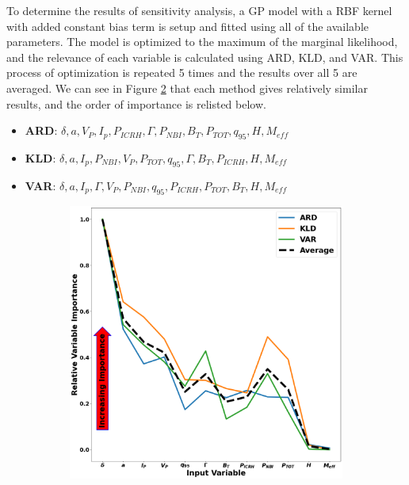 \documentclass[a4paper, twoside, final, 12pt]{article}
\begin{document}
{To determine the results of sensitivity analysis, a GP model with a RBF kernel with added constant bias term is setup and fitted using all of the available parameters. The model is optimized to the maximum of the marginal likelihood, and the relevance of each variable is calculated using ARD, KLD, and VAR. This process of optimization is repeated 5 times and the results over all 5 are averaged. We can see in Figure \ref{subfig:ARD_KL_VAR} that each method gives relatively similar results, and the order of importance is relisted below.  
\begin{itemize}
	\item \textbf{ARD}: $\delta, a, V_P,  I_p, P_{ICRH}, \Gamma, P_{NBI},  B_T, P_{TOT}, q_{95}, H, M_{eff}$
	\item \textbf{KLD}: $\delta, a,  I_p, P_{NBI}, V_P, P_{TOT},  q_{95}, \Gamma, B_T, P_{ICRH}, H, M_{eff}$
	\item \textbf{VAR}: $\delta, a, I_p, \Gamma, V_P, P_{NBI}, q_{95}, P_{ICRH}, P_{TOT}, B_T, H, M_{eff}$
\end{itemize}
\begin{figure}
	\begin{subfigure}{0.48\linewidth}
		\centering
		\includegraphics[scale=0.2]{ ./src/GP_sensitivity_analysis_final_v1}
		\caption{}
		\label{subfig:ARD_KL_VAR}
	\end{subfigure}\hfill

\end{figure}}
\end{document}
